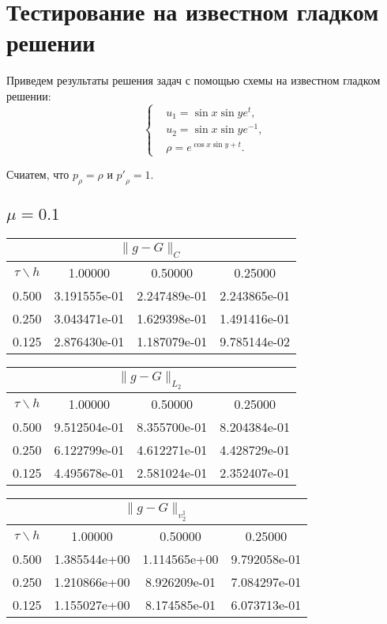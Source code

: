 \section{Тестирование на известном гладком решении}
Приведем результаты решения задач с помощью схемы на известном гладком решении:
\begin{equation}
\left\{
\begin{aligned}
	& u_1 = \sin x \sin y e^t, \\
	& u_2 = \sin x \sin y e^{-1}, \\
	& \rho = e^{\cos x \sin y + t}.
\end{aligned}
\right.
\end{equation}

Счиатем, что $p_\rho = \rho$ и ${p'}_\rho = 1$.
\subsection{$\mu=0.1$}
\begin{center}
\begin{tabular}{||c|c|c|c||}
\hline
\hline
\multicolumn{4}{||c||}{$\|g-G\| _{C}$}\\ 
\hline
\hline
$\tau \backslash h$ & 1.00000 & 0.50000 & 0.25000\\ 
\hline
0.500& 3.191555e-01 &2.247489e-01 &2.243865e-01 \\
\hline
0.250& 3.043471e-01 &1.629398e-01 &1.491416e-01 \\
\hline
0.125& 2.876430e-01 &1.187079e-01 &9.785144e-02 \\
\hline
\hline
\end{tabular}
\end{center}
\begin{center}
\begin{tabular}{||c|c|c|c||}
\hline
\hline
\multicolumn{4}{||c||}{$\|g-G\| _{L_2}$}\\ 
\hline
\hline
$\tau \backslash h$ & 1.00000 & 0.50000 & 0.25000\\ 
\hline
0.500& 9.512504e-01 &8.355700e-01 &8.204384e-01 \\ 
\hline
0.250& 6.122799e-01 &4.612271e-01 &4.428729e-01 \\
\hline
0.125& 4.495678e-01 &2.581024e-01 &2.352407e-01 \\
\hline
\hline
\end{tabular}
\end{center}
\begin{center}
\begin{tabular}{||c|c|c|c||}
\hline
\hline
\multicolumn{4}{||c||}{$\|g-G\| _{v_2^1}$}\\ 
\hline
\hline
$\tau \backslash h$ & 1.00000 & 0.50000 & 0.25000\\ 
\hline 
0.500& 1.385544e+00 &1.114565e+00 &9.792058e-01 \\ 
\hline
0.250& 1.210866e+00 &8.926209e-01 &7.084297e-01 \\ 
\hline
0.125& 1.155027e+00 &8.174585e-01 &6.073713e-01 \\ 
\hline
\hline
\end{tabular}
\end{center}
